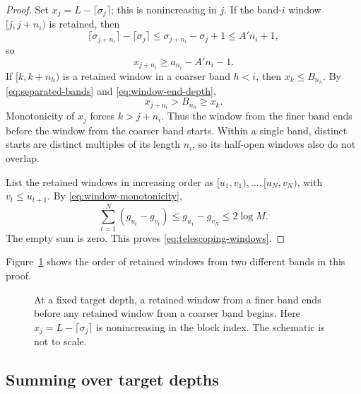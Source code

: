 \begin{proof}
Set $x_j=L-\lceil\sigma_j\rceil$; this is nonincreasing in $j$.
If the band-$i$ window $[j,j+n_i)$ is retained, then
\[
 \lceil\sigma_{j+n_i}\rceil-\lceil\sigma_j\rceil
 \le\sigma_{j+n_i}-\sigma_j+1\le A'n_i+1,
\]
so
\begin{equation}\label{eq:window-end-depth}
 x_{j+n_i}\ge a_{n_i}-A'n_i-1.
\end{equation}
If $[k,k+n_h)$ is a retained window in a coarser band $h<i$, then
$x_k\le B_{n_h}$.  By \eqref{eq:separated-bands} and
\eqref{eq:window-end-depth},
\[
 x_{j+n_i}>B_{n_h}\ge x_k.
\]
Monotonicity of $x_j$ forces $k>j+n_i$.  Thus the window from the finer band
ends before the window from the coarser band starts.  Within a single band,
distinct starts are distinct multiples of its length $n_i$, so its
half-open windows also do not overlap.

List the retained windows in increasing order as
$[u_1,v_1),\ldots,[u_N,v_N)$, with $v_t\le u_{t+1}$.  By
\eqref{eq:window-monotonicity},
\[
 \sum_{t=1}^N(g_{u_t}-g_{v_t})
 \le g_{u_1}-g_{v_N}\le2\log M.
\]
The empty sum is zero.  This proves \eqref{eq:telescoping-windows}.
\end{proof}

Figure~\ref{fig:disjoint-windows} shows the order of retained windows
from two different bands in this proof.

\begin{figure}[t]
\centering
{}
\caption{At a fixed target depth, a retained window from a finer band
ends before any retained window from a coarser band begins.  Here
$x_j=L-\lceil\sigma_j\rceil$ is nonincreasing in the block index.  The
schematic is not to scale.}
\label{fig:disjoint-windows}
\end{figure}

\subsection{Summing over target depths}

